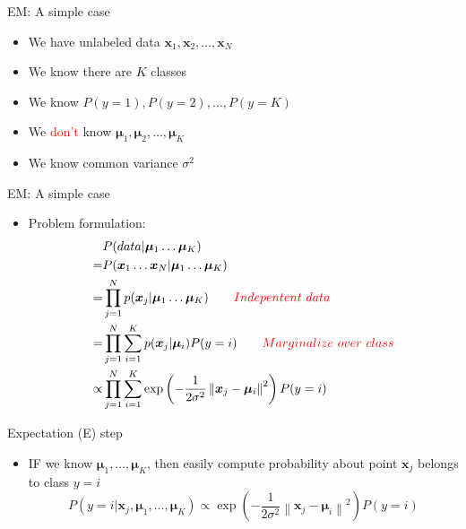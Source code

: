 \documentclass[11.5pt]{beamer}
\newcommand{\norm}[1]{\left\lVert#1\right\rVert}
\begin{document}
\begin{frame}{EM: A simple case}
\begin{itemize}
\item We have unlabeled data $\bm{x}_1, \bm{x}_2, \ldots, \bm{x}_N$
\item We know there are $K$ classes
\item We know $P(y=1), P(y=2),\ldots,P(y=K)$
\item We \textcolor{red}{don't} know $\bm{\mu}_1,\bm{\mu}_2,\ldots,\bm{\mu}_K$
\item We know common variance $\sigma^2$
\end{itemize}
\end{frame}

\begin{frame}{EM: A simple case}
\begin{itemize}
\item Problem formulation:
\begin{equation} \nonumber
\begin{aligned}
&P(data|\bm{\mu}_1\ldots\bm{\mu}_K)\\
=&P(\bm{x}_1\ldots\bm{x}_N|\bm{\mu}_1\ldots\bm{\mu}_K) \\
=&\prod_{j=1}^{N}p(\bm{x}_j|\bm{\mu}_1\ldots\bm{\mu}_K) \qquad \textcolor{red}{Indepentent~data} \\
=&\prod_{j=1}^{N}\sum_{i=1}^{K}p(\bm{x}_j|\bm{\mu}_i)P(y=i) \qquad \textcolor{red}{Marginalize~over~class} \\
\propto&\prod_{j=1}^{N}\sum_{i=1}^{K}\exp\left( -\frac{1}{2\sigma^2}\norm{\bm{x}_j-\bm{\mu}_i}^2 \right)P(y=i)
\end{aligned}
\end{equation}
\end{itemize}
\end{frame}
	
\begin{frame}{Expectation (E) step}
\begin{itemize}
\item IF we know $\bm{\mu}_1,\ldots,\bm{\mu}_K$, then easily compute probability about point $\bm{x}_j$ belongs to class $y=i$
\begin{equation} \nonumber
P(y=i|\bm{x}_j,\bm{\mu}_1,\ldots,\bm{\mu}_K)\propto \exp\left( -\frac{1}{2\sigma^2}\norm{\bm{x}_j-\bm{\mu}_i}^2 \right)P(y=i)
\end{equation}
\end{itemize}
\end{frame}
\end{document}
